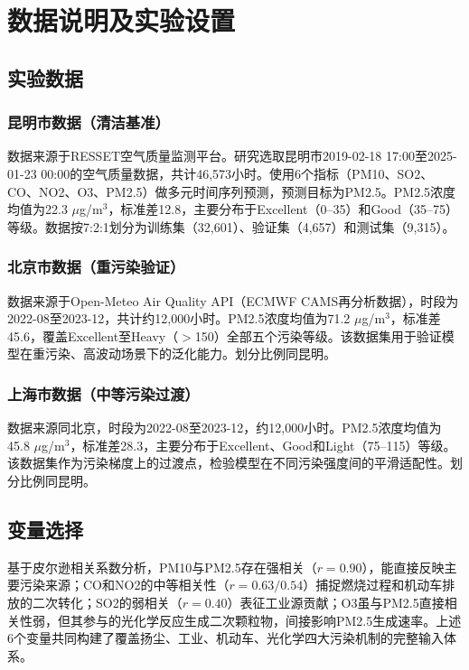 \documentclass[12pt,a4paper]{article}
\begin{document}
\section{数据说明及实验设置}

\subsection{实验数据}

\subsubsection{昆明市数据（清洁基准）}

数据来源于RESSET空气质量监测平台。研究选取昆明市2019-02-18 17:00至2025-01-23 00:00的空气质量数据，共计46,573小时。使用6个指标（PM10、SO2、CO、NO2、O3、PM2.5）做多元时间序列预测，预测目标为PM2.5。PM2.5浓度均值为22.3 $\mu$g/m$^3$，标准差12.8，主要分布于Excellent（0--35）和Good（35--75）等级。数据按7:2:1划分为训练集（32,601）、验证集（4,657）和测试集（9,315）。

\subsubsection{北京市数据（重污染验证）}

数据来源于Open-Meteo Air Quality API（ECMWF CAMS再分析数据），时段为2022-08至2023-12，共计约12,000小时。PM2.5浓度均值为71.2 $\mu$g/m$^3$，标准差45.6，覆盖Excellent至Heavy（$>$150）全部五个污染等级。该数据集用于验证模型在重污染、高波动场景下的泛化能力。划分比例同昆明。

\subsubsection{上海市数据（中等污染过渡）}

数据来源同北京，时段为2022-08至2023-12，约12,000小时。PM2.5浓度均值为45.8 $\mu$g/m$^3$，标准差28.3，主要分布于Excellent、Good和Light（75--115）等级。该数据集作为污染梯度上的过渡点，检验模型在不同污染强度间的平滑适配性。划分比例同昆明。

\subsection{变量选择}

基于皮尔逊相关系数分析，PM10与PM2.5存在强相关（$r=0.90$），能直接反映主要污染来源；CO和NO2的中等相关性（$r=0.63/0.54$）捕捉燃烧过程和机动车排放的二次转化；SO2的弱相关（$r=0.40$）表征工业源贡献；O3虽与PM2.5直接相关性弱，但其参与的光化学反应生成二次颗粒物\cite{huang2014high}，间接影响PM2.5生成速率。上述6个变量共同构建了覆盖扬尘、工业、机动车、光化学四大污染机制的完整输入体系。
\end{document}
